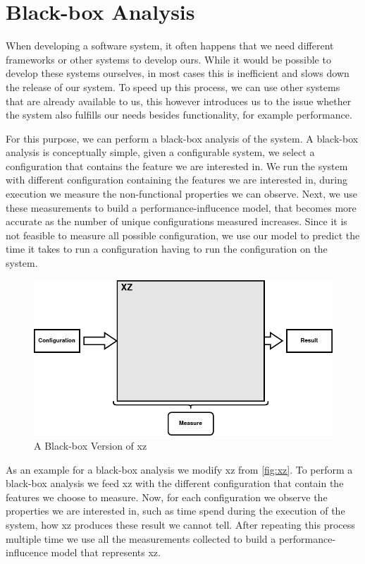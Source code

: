\section{Black-box Analysis}\label{ch:Blackbox}
When developing a software system, it often happens that we need different frameworks or other systems to develop ours.
While it would be possible to develop these systems ourselves, in most cases this is inefficient and slows down the release of our system.
To speed up this process, we can use other systems that are already available to us, this however introduces us to the issue whether the system 
also fulfills our needs besides functionality, for example performance. 

For this purpose, we can perform a black-box analysis of the system. 
A black-box analysis is conceptually simple, given a configurable system, we select a configuration that contains the feature we are interested in. 
We run the system with different configuration containing the features we are interested in,
during execution we measure the non-functional properties we can observe.
Next, we use these measurements to build a performance-influcence model, that becomes more accurate as the number of unique configurations measured increases. 
Since it is not feasible to measure all possible configuration, we use our model to predict the time it takes to run a configuration
having to run the configuration on the system.


\begin{figure}[h]
    \centering
    \includegraphics[scale=0.6]{gfx/BlackBoxXZ.png}
    \caption{A Black-box Version of xz}
    \label{fig:BBxz}
\end{figure}

As an example for a black-box analysis we modify xz from \ref{fig:xz}. To perform a black-box analysis we feed xz with the different configuration that
contain the features we choose to measure. Now, for each configuration we observe the properties we are interested in, such as time spend during the 
execution of the system, how xz produces these result we cannot tell. After repeating this process multiple time we use all the measurements collected to 
build a performance-influcence model that represents xz.


